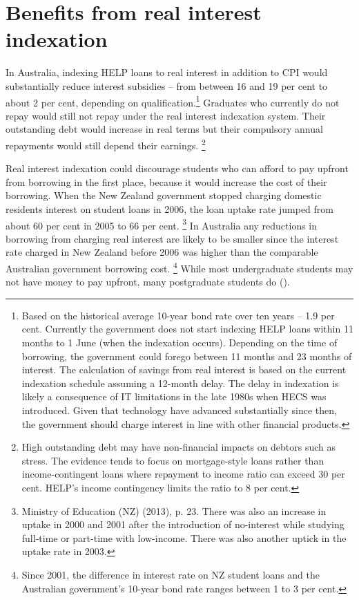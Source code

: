 \documentclass[embargoed]{grattan}
\begin{document}
\section{Benefits from real interest indexation}\label{benefits-from-real-interest-indexation}

In Australia, indexing \gls{HELP} loans to real interest in addition to \gls{CPI} would substantially reduce interest subsidies -- from between 16 and 19 per cent to about 2 per cent, depending on qualification.\protect\hypertarget{_Ref335647424}{}{}\footnote{Based on the historical average 10-year bond rate over ten years -- 1.9 per cent.
Currently the government does not start indexing \gls{HELP} loans within 11 months to 1 June (when the indexation occurs).
Depending on the time of borrowing, the government could forego between 11 months and 23 months of interest.
The calculation of savings from real interest is based on the current indexation schedule assuming a 12-month delay.
The delay in indexation is likely a consequence of IT limitations in the late 1980s when \gls{HECS} was introduced.
Given that technology have advanced substantially since then, the government should charge interest in line with other financial products.} Graduates who currently do not repay would still not repay under the real interest indexation system.
Their outstanding debt would increase in real terms but their compulsory annual repayments would still depend their earnings.%
\footnote{High outstanding debt may have non-financial impacts on debtors such as stress.
The evidence tends to focus on mortgage-style loans rather than income-contingent loans where repayment to income ratio can exceed 30 per cent.
\gls{HELP}'s income contingency limits the ratio to 8 per cent.\label{fn:68-High-outstanding-debt-non-fin-impact}}

Real interest indexation could discourage students who can afford to pay upfront from borrowing in the first place, because it would increase the cost of their borrowing.
When the New Zealand government stopped charging domestic residents interest on student loans in 2006, the loan uptake rate jumped from about 60 per cent in 2005 to 66 per cent.%
\footnote{Ministry of Education (NZ) (2013), p. 23.
There was also an increase in uptake in 2000 and 2001 after the introduction of no-interest while studying full-time or part-time with low-income.
There was also another uptick in the uptake rate in 2003.} In Australia any reductions in borrowing from charging real interest are likely to be smaller since the interest rate charged in New Zealand before 2006 was higher than the comparable Australian government borrowing cost.%
\footnote{Since 2001, the difference in interest rate on NZ student loans and the Australian government's 10-year bond rate ranges between 1 to 3 per cent.} While most undergraduate students may not have money to pay upfront, many postgraduate students do ().
\end{document}
